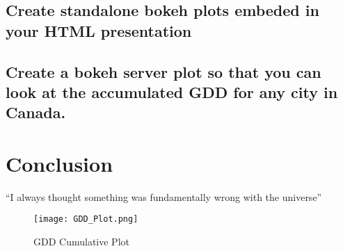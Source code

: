 \documentclass{article}
\begin{document}
\subsection{Create standalone bokeh plots embeded in your HTML presentation}
\subsection{Create a bokeh server plot so that you can look at the accumulated GDD for any city in Canada.}



\section{Conclusion}
``I always thought something was fundamentally wrong with the universe''\citep{adams1995hitchhiker}




\begin{figure}[h!]
\centering
\texttt{[image: GDD\_Plot.png]}
\caption{GDD Cumulative Plot}
\label{fig: GDD Plot}
\end{figure}
\end{document}
